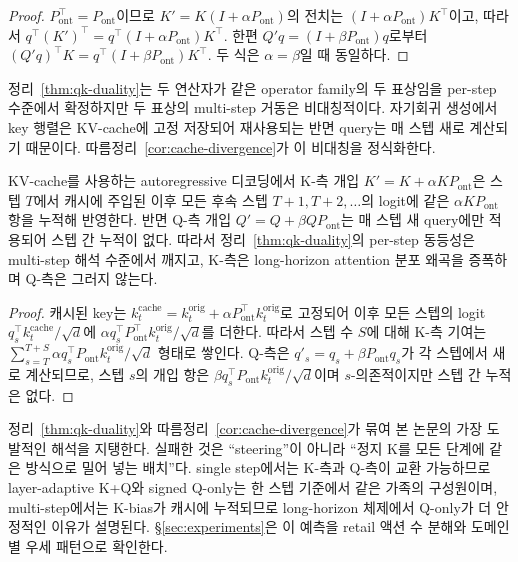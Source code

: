 \begin{proof}
$P_{\mathrm{ont}}^\top = P_{\mathrm{ont}}$이므로 $K' = K(I + \alpha P_{\mathrm{ont}})$의 전치는 $(I + \alpha P_{\mathrm{ont}}) K^\top$이고, 따라서 $q^\top (K')^\top = q^\top (I + \alpha P_{\mathrm{ont}}) K^\top$. 한편 $Q' q = (I + \beta P_{\mathrm{ont}}) q$로부터 $(Q' q)^\top K = q^\top (I + \beta P_{\mathrm{ont}}) K^\top$. 두 식은 $\alpha = \beta$일 때 동일하다.
\end{proof}

정리~\ref{thm:qk-duality}는 두 연산자가 같은 operator family의 두 표상임을 per-step 수준에서 확정하지만 두 표상의 multi-step 거동은 비대칭적이다. 자기회귀 생성에서 key 행렬은 KV-cache에 고정 저장되어 재사용되는 반면 query는 매 스텝 새로 계산되기 때문이다. 따름정리~\ref{cor:cache-divergence}가 이 비대칭을 정식화한다.

\begin{corollary}\label{cor:cache-divergence}
KV-cache를 사용하는 autoregressive 디코딩에서 K-측 개입 $K' = K + \alpha K P_{\mathrm{ont}}$은 스텝 $T$에서 캐시에 주입된 이후 모든 후속 스텝 $T+1, T+2, \dots$의 logit에 같은 $\alpha K P_{\mathrm{ont}}$ 항을 누적해 반영한다. 반면 Q-측 개입 $Q' = Q + \beta Q P_{\mathrm{ont}}$는 매 스텝 새 query에만 적용되어 스텝 간 누적이 없다. 따라서 정리~\ref{thm:qk-duality}의 per-step 동등성은 multi-step 해석 수준에서 깨지고, K-측은 long-horizon attention 분포 왜곡을 증폭하며 Q-측은 그러지 않는다.
\end{corollary}

\begin{proof}
캐시된 key는 $k_t^{\text{cache}} = k_t^{\text{orig}} + \alpha P_{\mathrm{ont}}^\top k_t^{\text{orig}}$로 고정되어 이후 모든 스텝의 logit $q_s^\top k_t^{\text{cache}}/\sqrt d$에 $\alpha q_s^\top P_{\mathrm{ont}}^\top k_t^{\text{orig}}/\sqrt d$를 더한다. 따라서 스텝 수 $S$에 대해 K-측 기여는 $\sum_{s=T}^{T+S} \alpha q_s^\top P_{\mathrm{ont}} k_t^{\text{orig}}/\sqrt d$ 형태로 쌓인다. Q-측은 $q'_s = q_s + \beta P_{\mathrm{ont}} q_s$가 각 스텝에서 새로 계산되므로, 스텝 $s$의 개입 항은 $\beta q_s^\top P_{\mathrm{ont}} k_t^{\text{orig}}/\sqrt d$이며 $s$-의존적이지만 스텝 간 누적은 없다.
\end{proof}

정리~\ref{thm:qk-duality}와 따름정리~\ref{cor:cache-divergence}가 묶여 본 논문의 가장 도발적인 해석을 지탱한다. 실패한 것은 ``steering''이 아니라 ``정지 K를 모든 단계에 같은 방식으로 밀어 넣는 배치''다. single step에서는 K-측과 Q-측이 교환 가능하므로 layer-adaptive K+Q와 signed Q-only는 한 스텝 기준에서 같은 가족의 구성원이며, multi-step에서는 K-bias가 캐시에 누적되므로 long-horizon 체제에서 Q-only가 더 안정적인 이유가 설명된다. \S\ref{sec:experiments}은 이 예측을 retail 액션 수 분해와 도메인별 우세 패턴으로 확인한다.

